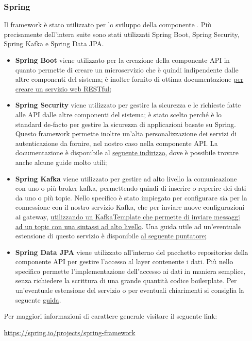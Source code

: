 		\subsubsection{Spring}
			Il framework  è stato utilizzato per lo sviluppo della componente . Più precisamente dell'intera suite sono stati utilizzati Spring Boot, Spring Security, Spring Kafka e Spring Data JPA.
			\newline
			\begin{itemize}
				\item \textbf{Spring Boot} viene utilizzato per la creazione della componente API in quanto permette di creare un microservizio che è quindi indipendente dalle altre componenti del sistema; è inoltre fornito di ottima documentazione \href{https://spring.io/guides/gs/rest-service/}{per creare un servizio web RESTful};
				\item \textbf{Spring Security} viene utilizzato per gestire la sicurezza e le richieste fatte alle API dalle altre componenti del sistema; è stato scelto perché è lo standard de-facto per gestire la sicurezza di applicazioni basate su Spring.
				Questo framework permette inoltre un'alta personalizzazione dei servizi di autenticazione da fornire, nel nostro caso nella componente API. La documentazione è disponibile al \href{https://spring.io/projects/spring-security#learn}{seguente indirizzo}, dove è possibile trovare anche alcune guide molto utili;
				\item \textbf{Spring Kafka} viene utilizzato per gestire ad alto livello la comunicazione con uno o più broker kafka, permettendo quindi di inserire o reperire dei dati da uno o più topic.
				Nello specifico è stato impiegato per configurare sia per la connessione con il nostro servizio Kafka, che per inviare nuove configurazioni ai gateway, \href{https://docs.spring.io/spring-kafka/docs/2.4.6.RELEASE/reference/html/#kafka-template}{utilizzando un KafkaTemplate che permette di inviare messaggi ad un topic con una sintassi ad alto livello}.
				Una guida utile ad un'eventuale estensione di questo servizio è disponibile \href{https://docs.spring.io/spring-kafka/docs/2.4.6.RELEASE/reference/html/#reference}{al seguente puntatore};
				\item \textbf{Spring Data JPA} viene utilizzato all'interno del pacchetto repositories della componente API per gestire l'accesso al layer contenente i dati. Più nello specifico permette l'implementazione dell'accesso ai dati in maniera semplice, senza richiedere la scrittura di una grande quantità codice boilerplate. Per un'eventuale estensione del servizio o per eventuali chiarimenti si consiglia la seguente \href{https://spring.io/guides/gs/accessing-data-jpa/}{guida}.
			\end{itemize}
			Per maggiori informazioni di carattere generale visitare il seguente link:
			\newline
			\begin{center}
				\url{https://spring.io/projects/spring-framework}
			\end{center}
